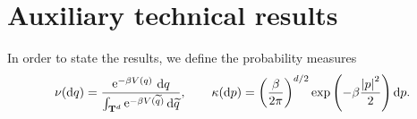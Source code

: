 \documentclass[11pt,a4paper]{article}
\DeclareMathOperator{\e}{e}
\newcommand{\expect}[0]{\mathbf{E}}
\newcommand{\torus}{\mathbf T}
\renewcommand{\d}{\mathrm d}
\theoremstyle{plain}
\numberwithin{equation}{section}
\begin{document}
\appendix
\section{Auxiliary technical results}%
\label{sec:auxiliary_technical_results}

In order to state the results, we define the probability measures
\[
    \nu(\d q) = \frac{\e^{- \beta V(q)} \, \d q}{\int_{\torus^d}\e^{-\beta V(\widetilde q)} \d \widetilde q},
    \qquad \kappa(\d p) = \left( \frac{\beta}{2 \pi} \right)^{d/2}\exp \left( - \beta \frac{\abs{p}^2}{2} \right) \d p.
\]
\end{document}
